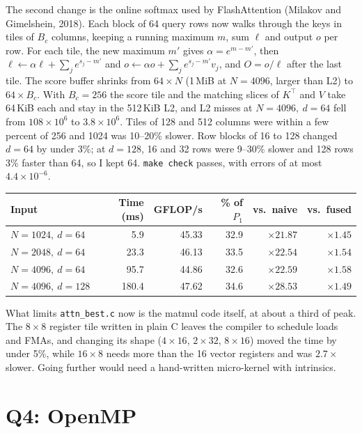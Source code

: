 \documentclass[11pt,a4paper]{article}
\begin{document}
The second change is the online softmax used by FlashAttention (Milakov and Gimelshein, 2018).
Each block of 64 query rows now walks through the keys in tiles of $B_c$ columns, keeping a
running maximum $m$, sum $\ell$ and output $o$ per row. For each tile, the new maximum
$m'$ gives $\alpha = e^{m - m'}$, then $\ell \leftarrow \alpha\ell + \sum_j e^{s_j - m'}$ and
$o \leftarrow \alpha o + \sum_j e^{s_j - m'} v_j$, and $O = o/\ell$ after the last tile. The
score buffer shrinks from $64 \times N$ (1\,MiB at $N=4096$, larger than L2) to
$64 \times B_c$. With $B_c = 256$ the score tile and the matching slices of $K^\top$ and $V$
take 64\,KiB each and stay in the 512\,KiB L2, and L2 misses at $N=4096,\ d=64$ fell from
$108\times10^6$ to $3.8\times10^6$. Tiles of 128 and 512 columns were within a few percent of
256 and 1024 was 10--20\% slower. Row blocks of 16 to 128 changed $d=64$ by under 3\%; at
$d=128$, 16 and 32 rows were 9--30\% slower and 128 rows 3\% faster than 64, so I kept 64. \texttt{make check}
passes, with errors of at most $4.4\times10^{-6}$.

\begin{center}
\begin{tabular}{@{}lrrrrr@{}}
\toprule
Input & Time (ms) & GFLOP/s & \% of $P_1$ & vs.\ naive & vs.\ fused \\
\midrule
$N=1024,\ d=64$  & 5.9   & 45.33 & 32.9 & $\times21.87$ & $\times1.45$ \\
$N=2048,\ d=64$  & 23.3  & 46.13 & 33.5 & $\times22.54$ & $\times1.54$ \\
$N=4096,\ d=64$  & 95.7  & 44.86 & 32.6 & $\times22.59$ & $\times1.58$ \\
$N=4096,\ d=128$ & 180.4 & 47.62 & 34.6 & $\times28.53$ & $\times1.49$ \\
\bottomrule
\end{tabular}
\end{center}

What limits \texttt{attn\_best.c} now is the matmul code itself, at about a third of peak. The
$8 \times 8$ register tile written in plain C leaves the compiler to schedule loads and FMAs,
and changing its shape ($4 \times 16$, $2 \times 32$, $8 \times 16$) moved the time by under
5\%, while $16 \times 8$ needs more than the 16 vector registers and was $2.7\times$ slower.
Going further would need a hand-written micro-kernel with intrinsics.

\section*{Q4: OpenMP}
\end{document}
